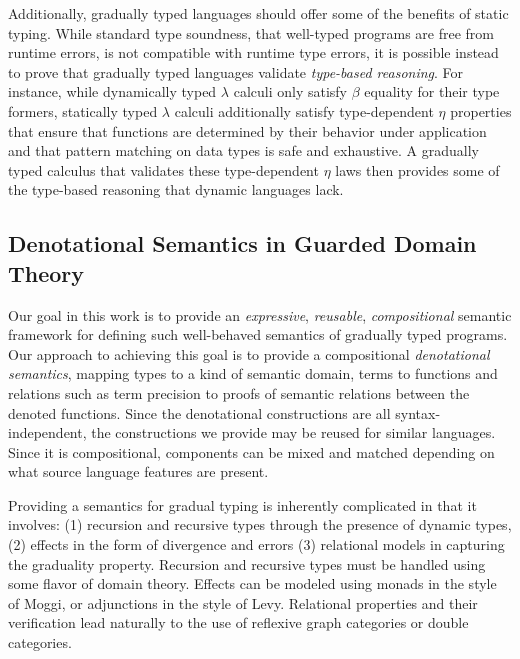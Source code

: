 Additionally, gradually typed languages should offer some of the
benefits of static typing. While standard type soundness, that
well-typed programs are free from runtime errors, is not compatible
with runtime type errors, it is possible instead to prove that
gradually typed languages validate \emph{type-based reasoning}. For
instance, while dynamically typed $\lambda$ calculi only satisfy
$\beta$ equality for their type formers, statically typed $\lambda$
calculi additionally satisfy type-dependent $\eta$ properties that
ensure that functions are determined by their behavior under
application and that pattern matching on data types is safe and
exhaustive. A gradually typed calculus that validates these
type-dependent $\eta$ laws then provides some of the type-based
reasoning that dynamic languages lack.


\subsection{Denotational Semantics in Guarded Domain Theory}

Our goal in this work is to provide an \emph{expressive},
\emph{reusable}, \emph{compositional} semantic framework for defining
such well-behaved semantics of gradually typed programs.
%
Our approach to achieving this goal is to provide a compositional
\emph{denotational semantics}, mapping types to a kind of semantic
domain, terms to functions and relations such as term precision to
proofs of semantic relations between the denoted functions.
%
Since the denotational constructions are all syntax-independent, the
constructions we provide may be reused for similar languages. Since it
is compositional, components can be mixed and matched depending on
what source language features are present.

Providing a semantics for gradual typing is inherently complicated in
that it involves: (1) recursion and recursive types through the
presence of dynamic types, (2) effects in the form of divergence and
errors (3) relational models in capturing the graduality
property. Recursion and recursive types must be handled using some
flavor of domain theory. Effects can be modeled using monads in the
style of Moggi, or adjunctions in the style of
Levy\cite{MOGGI199155,39155,levy99,levystacks}. Relational properties and their verification
lead naturally to the use of reflexive graph categories or double
categories\cite{dunphythesis,new-licata18}.

